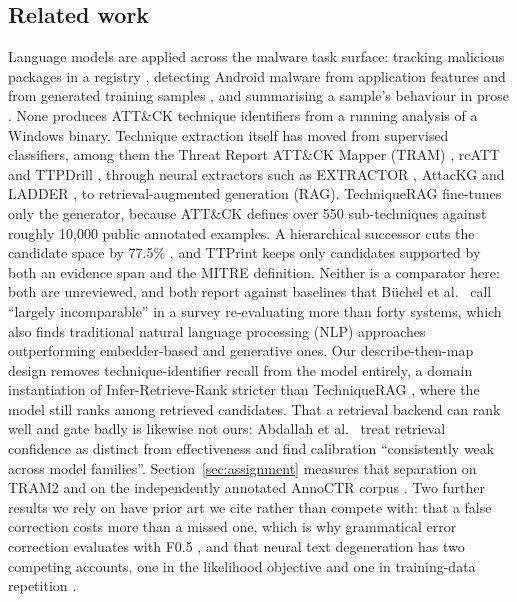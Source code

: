 \subsection{Related work}
\label{sec:related}

Language models are applied across the malware task surface: tracking malicious packages in a
registry \citep{yu2024maltracker}, detecting Android malware from application features
\citep{zhao2025apppoet} and from generated training samples \citep{rollinson2026samples}, and
summarising a sample's behaviour in prose \citep{saha2025malaware}. None produces ATT\&CK technique
identifiers from a running analysis of a Windows binary. Technique extraction itself has moved from
supervised classifiers, among them the Threat Report ATT\&CK Mapper (TRAM) \citep{mitre2023tram},
rcATT \citep{legoy2020rcatt} and TTPDrill \citep{husari2017ttpdrill}, through neural extractors such
as EXTRACTOR \citep{satvat2021extractor}, AttacKG \citep{li2022attackg} and LADDER
\citep{alam2023ladder}, to retrieval-augmented generation (RAG). TechniqueRAG
\citep{lekssays2025techniquerag} fine-tunes only the generator, because ATT\&CK defines over 550
sub-techniques against roughly 10,000 public annotated examples. A hierarchical successor cuts the
candidate space by 77.5\% , and TTPrint
 keeps only candidates supported by both an evidence span and the
MITRE definition. Neither is a comparator here: both are unreviewed, and both report against
baselines that B\"uchel et al.~\cite{buchel2025sok} call ``largely incomparable'' in a survey re-evaluating more
than forty systems, which also finds traditional natural language processing (NLP) approaches
outperforming embedder-based and generative ones. Our describe-then-map design removes
technique-identifier recall from the model entirely, a domain instantiation of Infer-Retrieve-Rank
 stricter than TechniqueRAG \cite{lekssays2025techniquerag}, where the
model still ranks among retrieved candidates. That a retrieval backend can rank well and gate badly
is likewise not ours: Abdallah et al.~\cite{abdallah2026retrievers} treat retrieval confidence as distinct from
effectiveness and find calibration ``consistently weak across model families''.
Section~\ref{sec:assignment} measures that separation on TRAM2 \citep{mitre2023tram} and on the
independently annotated AnnoCTR corpus \citep{lange2024annoctr}. Two further results we rely on have
prior art we cite rather than compete with: that a false correction costs more than a missed one,
which is why grammatical error correction evaluates with F0.5 \citep{ng2014conll,bryant2019bea}, and
that neural text degeneration has two competing accounts, one in the likelihood objective and one in
training-data repetition \citep{welleck2019unlikelihood,li2023repetition}.

